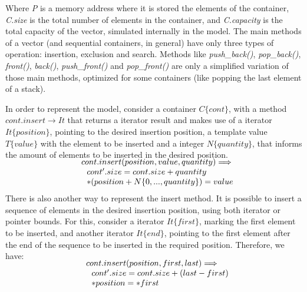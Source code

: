 \documentclass[a4paper]{llncs}
\begin{document}
	Where \textit{P} is a memory address where it is stored the elements of the container, \textit{C.size} is the total number of elements in the container, and \textit{C.capacity} is the total capacity of the vector, simulated internally in the model.
	The main methods of a vector (and sequential containers, in general) have only three types of operation: insertion, exclusion and search. Methods like \textit{push\_back()}, \textit{pop\_back()}, \textit{front()}, \textit{back()}, \textit{push\_front()} and \textit{pop\_front()} are only a simplified variation of those main methods, optimized for some containers (like popping the last element of a stack).

	In order to represent the model, consider a container $C\{cont\}$, with a method $cont.insert \rightarrow It$ that returns a iterator result and makes use of a iterator $It\{position\}$, pointing to the desired insertion position, a template value $T\{value\}$ with the element to be inserted and a integer $N\{quantity\}$, that informs the amount of elements to be inserted in the desired position.\\
	
\[\begin{array}{r@{\:\:}c@{\:\:}l}\label{insert1-model}
\\[-5ex]
	 & &	cont.insert(position, value, quantity) \Longrightarrow  \\
	 &   &	\: \: \: cont'.size = cont.size + quantity \\
	 &   &	\: \: \: *(position + N\{0, ... ,quantity\}) = value \\
\end{array}
\]
	There is also another way to represent the insert method. It is possible to insert a sequence of elements in the desired insertion position, using both iterator or pointer bounds. For this, consider a iterator $It\{first\}$, marking the first element to be inserted, and another iterator $It\{end\}$, pointing to the first element after the end of the sequence to be inserted in the required position. Therefore, we have:\\

\[\begin{array}{r@{\:\:}c@{\:\:}l}\label{insert2-model}
\\[-5ex]
	 & &	 cont.insert(position, first, last) \Longrightarrow \\
	 &   &\: \: \: cont'.size = cont.size +( last - first) \\
	 &   &\: \: \: *position = *first \\
\end{array}
\]
\end{document}
